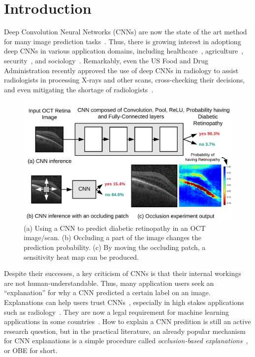 \section{Introduction}
Deep Convolution Neural Networks (CNNs) are now the state of the art method for many image prediction tasks~\cite{imagenet}. Thus, there is growing interest in adoptiong deep CNNs in various application domains, including healthcare~\cite{kermany2018identifying, islam2017abnormality}, agriculture~\cite{mohanty2016using}, security~\cite{arbabzadah2016identifying}, and sociology~\cite{wang2017deep}. Remarkably, even the US Food and Drug Administration recently approved the use of deep CNNs in radiology to assist radiologists in processing X-rays and other scans, cross-checking their decisions, and even mitigating the shortage of radiologists~\cite{fdaretinopathy,radiologistshortage}.


\begin{figure}[t]
\includegraphics[width=\columnwidth]{./images/krypton_overview}
\vspace{-6mm}
\caption{(a) Using a CNN to predict diabetic retinopathy in an OCT image/scan. (b) Occluding a part of the image changes the prediction probability. (c) By moving the occluding patch, a sensitivity heat map can be produced.}
\label{fig:krypton_overview}
\end{figure}

Despite their successes, a key criticism of CNNs is that their internal workings are not human-understandable. Thus, many application users seek an ``explanation'' for why a CNN predicted a certain label on an image. Explanations can help users trust CNNs~\cite{lime}, especially in high stakes applications such as radiology~\cite{jung2017deep}. They are now a legal requirement for machine learning applications in some countries~\cite{GDPR}. How to explain a CNN predition is still an active research question, but in the practical literature, an already popular mechanism for CNN explanations is a simple procedure called \textit{occlusion-based explanations}~\cite{zeiler2014visualizing}, or OBE for short.

